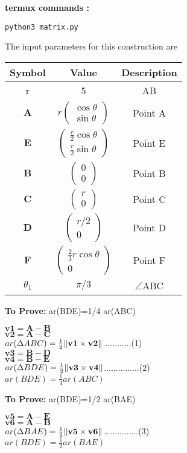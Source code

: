 \documentclass[10pt, a4paper]{article}
\newcommand{\myvec}[1]{\ensuremath{\begin{pmatrix}#1\end{pmatrix}}}
\let\vec\mathbf
\begin{document}
\textbf{termux commands :}
\begin{lstlisting}
python3 matrix.py
\end{lstlisting}


The input parameters for this construction are 
\begin{center}
\begin{tabular}{|c|c|c|}
 \hline
 \textbf{Symbol}&\textbf{Value}&\textbf{Description}\\
 \hline
 r&5&AB\\
 \hline

 $\vec{A}$&$r\myvec{\cos\theta \\ \sin\theta}$%
 &Point A\\
 \hline
 $\vec{E}$&$\myvec{\frac{r}{2}\cos\theta \\ \frac{r}{2}\sin\theta}$
 &Point E\\
 \hline
 $\vec{B}$&$\myvec{0 \\ 0}$%
 &Point B\\
 \hline
 $\vec{C}$&$\myvec{r \\ 0}$%
 &Point C\\
 \hline
 $\vec{D}$&$\myvec{r/2 \\ 0}$%
 &Point D\\
 \hline
 $\vec{F}$&$\myvec{\frac{2}{3}r\cos\theta \\ 0}$%
 &Point F\\
 \hline
 ${\theta}_1$& $\pi/3$&$ \angle $ABC\\ 
 \hline
\end{tabular}
\end{center}
\textbf{To Prove:} ar(BDE)=1/4 ar(ABC)
  \begin{center}
 
 $\vec{v1}=\vec{A-B}$\\
 $\vec{v2}=\vec{A-C}$\\

$ar(\Delta ABC) =\frac{1}{2}\norm{\vec{v1}\times\vec{v2}}$............(1)\\
$\vec{v3}=\vec{B-D}$\\
 $\vec{v4}=\vec{B-E}$\\
 
 $ar(\Delta BDE) =\frac{1}{2}\norm{\vec{v3}\times\vec{v4}}$...............(2)\\
 $ar(BDE)= \frac{1}{4} ar(ABC)$
 \end{center}
 \textbf{To Prove:}  ar(BDE)=1/2 ar(BAE) 
 \begin{center}
$\vec{v5}=\vec{A-E}$\\
$\vec{v6}=\vec{A-B}$\\

 $ar(\Delta BAE) =\frac{1}{2}\norm{\vec{v5}\times\vec{v6}}$...............(3)\\
 $ar(BDE)=\frac{1}{2} ar(BAE)$
\end{center}
\end{document}
